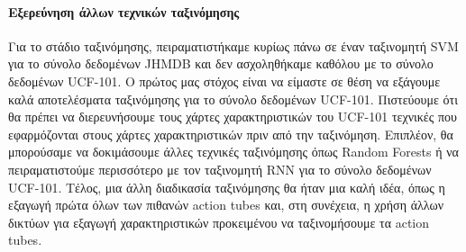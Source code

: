 \paragraph{Εξερεύνηση άλλων τεχνικών ταξινόμησης}

Για το στάδιο ταξινόμησης, πειραματιστήκαμε κυρίως πάνω σε έναν ταξινομητή \en SVM  \gr για το σύνολο δεδομένων \en JHMDB \gr και δεν ασχοληθήκαμε καθόλου  με το σύνολο δεδομένων \en UCF-101\gr. Ο πρώτος μας
στόχος είναι να είμαστε σε θέση να εξάγουμε καλά αποτελέσματα ταξινόμησης για το σύνολο δεδομένων \en UCF-101\gr.  Πιστεύουμε ότι θα πρέπει να διερευνήσουμε τους χάρτες χαρακτηριστικών του \en UCF-101   τεχνικές  που εφαρμόζονται στους χάρτες χαρακτηριστικών πριν από την ταξινόμηση. Επιπλέον, θα μπορούσαμε να δοκιμάσουμε άλλες τεχνικές ταξινόμησης όπως \en Random Forests \gr ή να πειραματιστούμε περισσότερο με τον ταξινομητή \en RNN \gr για το σύνολο δεδομένων \en UCF-101\gr.
Τέλος, μια άλλη διαδικασία ταξινόμησης θα ήταν μια καλή ιδέα, όπως η εξαγωγή πρώτα όλων των πιθανών \en action tubes \gr και, στη συνέχεια, η χρήση άλλων δικτύων για εξαγωγή χαρακτηριστικών προκειμένου
να ταξινομήσουμε τα \en action tubes\gr.

\en
% 